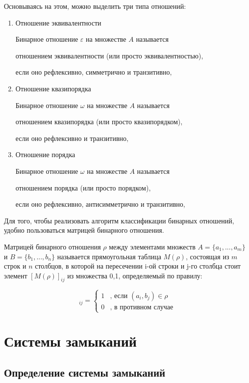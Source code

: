 \documentclass[bachelor, och, labwork]{shiza}
\begin{document}
	Основываясь на этом, можно выделить три типа отношений:
	
	\begin{enumerate}
		\item Отношение эквивалентности
		
		Бинарное отношение $\varepsilon $ на множестве $A$ называется 
		
		$\textit{отношением эквивалентности}$ (или просто $\textit{эквивалентностью}$),
		
		если оно рефлексивно, симметрично и транзитивно,
		\item Отношение квазипорядка
		
		Бинарное отношение $\omega $ на множестве $A$ называется 
		
		$\textit{отношением квазипорядка}$ (или просто $\textit{квазипорядком}$),
		
		 если оно рефлексивно и транзитивно,
		\item Отношение порядка
		
		Бинарное отношение $\omega $ на множестве $A$ называется 
		
		$\textit{отношением порядка}$ (или просто $\textit{порядком}$),
		
		 если оно рефлексивно, антисимметрично и транзитивно,
	\end{enumerate}
		
	Для того, чтобы реализовать алгоритм классификации бинарных отношений, удобно пользоваться матрицей бинарного отношения.
	
	$\textit{Матрицей}$ бинарного отношения $\rho$ между элементами множеств $A = \{a_1, ..., a_m\}$ и $B = \{b_1, ..., b_n\}$ называется прямоугольная таблица $M(\rho)$, состоящая из $m$ строк и $n$ столбцов, в которой на пересечении i-ой строки и j-го столбца стоит элемент $[M(\rho)]_{ij}$ из множества {0,1}, определяемый по правилу:
	
	\begin{equation*}
		[M(\rho)]_{ij} =  
		\begin{cases}
			1 &\text{, если $(a_i, b_j) \in \rho$}\\
			0 &\text{, в противном случае}
		\end{cases}
	\end{equation*}


		\section{Системы замыканий}
	\subsection{Определение системы замыканий}
	
\end{document}
